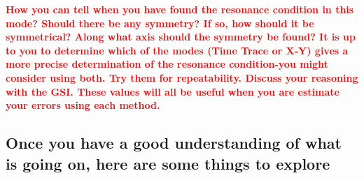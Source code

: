 \documentclass{../lab}
\begin{document}
\textbf{\textcolor{red}{How you can tell when you have found the resonance condition in this mode? Should there be any symmetry? If so, how should it be symmetrical? Along what axis should the symmetry be found? It is up to you to determine which of the modes (Time Trace or X-Y) gives a more precise determination of the resonance condition-you might consider using both. Try them for repeatability. Discuss your reasoning with the GSI. These values will all be useful when you are estimate your errors using each method.}}

\subsection{Once you have a good understanding of what is going on, here are some things to explore}
\end{document}

